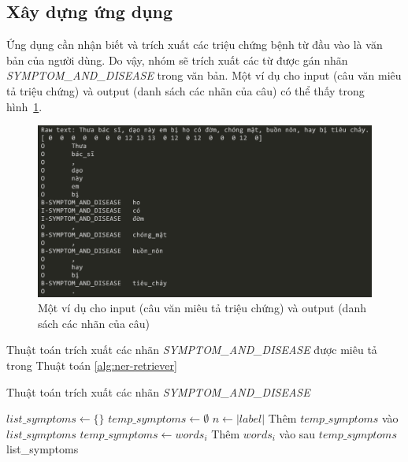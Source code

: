 \documentclass[12pt]{article}
\begin{document}
\subsection{Xây dựng ứng dụng}
Ứng dụng cần nhận biết và trích xuất các triệu chứng bệnh từ đầu vào là văn bản của người dùng. Do vậy, nhóm sẽ trích xuất các từ được gán nhãn \textit{SYMPTOM\_AND\_DISEASE} trong văn bản. Một ví dụ cho input (câu văn miêu tả triệu chứng) và output (danh sách các nhãn của câu) có thể thấy trong hình~\ref{fig:example-result}.
\begin{figure}
\centering
\includegraphics[scale=.5]{img/example-result.png}
\caption{Một ví dụ cho input (câu văn miêu tả triệu chứng) và output (danh sách các nhãn của câu)}
\label{fig:example-result}
\end{figure}

Thuật toán trích xuất các nhãn \textit{SYMPTOM\_AND\_DISEASE} được miêu tả trong Thuật toán \ref{alg:ner-retriever}

\begin{algorithm}
\caption{Thuật toán trích xuất các nhãn \textit{SYMPTOM\_AND\_DISEASE}}
\label{alg:ner-retriever}
\begin{algorithmic}
\State $list\_symptoms \gets \{\}$
\State $temp\_symptoms \gets \emptyset$
\State $n \gets |label|$
    \State Thêm $temp\_symptoms$ vào $list\_symptoms$
\EndIf
\State $temp\_symptoms \gets words_i$
\State Thêm $words_i$ vào sau $temp\_symptoms$
\EndIf
\EndFor
\State\Return list\_symptoms
\EndFunction
\end{algorithmic}
\end{algorithm}
\end{document}
